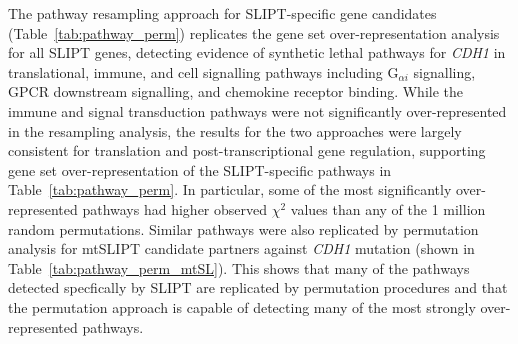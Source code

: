 The pathway resampling approach for \gls{SLIPT}-specific gene candidates (Table~\ref{tab:pathway_perm}) replicates the gene set over-represent\-ation analysis for all \gls{SLIPT} genes, detecting evidence of synthetic lethal pathways for \textit{CDH1} in translational, immune, and cell signalling pathways including  G$_{\alpha i}$ signalling, GPCR downstream signalling, and chemokine receptor binding. While the immune and signal transduction pathways were not significantly over-represented in the resampling analysis, the results for the two approaches were largely consistent for translation and post-transcriptional gene regulation, supporting gene set over-represent\-ation of the \gls{SLIPT}-specific pathways in Table~\ref{tab:pathway_perm}. In particular, some of the most significantly over-represented pathways had higher observed $\chi^2$ values than any of the 1 million random permutations. Similar pathways were also replicated by permutation analysis for mt\gls{SLIPT} candidate partners against \textit{CDH1} mutation (shown in Table~\ref{tab:pathway_perm_mtSL}). This shows that many of the pathways detected specfically by \gls{SLIPT} are replicated by permutation procedures and that the permutation approach is capable of detecting many of the most strongly over-represented pathways. 


